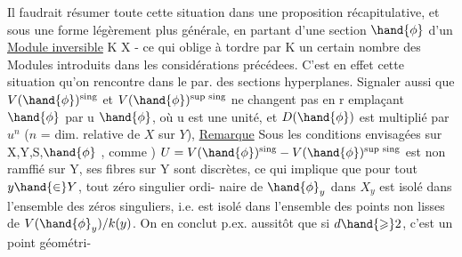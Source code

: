 \placedmargin{$\|$} Il faudrait résumer  toute cette situation dans une proposition
récapitulative, et sous une forme légèrement plus générale, en partant
d'une section $\hand{\phi}$ d'un \uline{Module inversible}  K  X - ce qui oblige
à tordre par K un certain nombre des Modules introduits dans les
considérations précédees. C'est en effet  cette situation qu'on
rencontre  dans le par. des sections hyperplanes. Signaler aussi que
\placedmargin{|} $V(\hand{\phi})^{\text{sing}}$  et $V(\hand{\phi})^{\text{sup sing}}$ ne changent pas en r emplaçant $\hand{\phi}$ par u $\hand{\phi}$,
où u est une unité, 
et $D(\hand{\phi})$ est multiplié par $u^n$ ($n$ = dim. relative de $X$ sur $Y$),
\uline{Remarque} Sous les conditions envisagées sur X,Y,S,$\hand{\phi}$ , comme )
$U = V(\hand{\phi})^{\text{sing}}- V(\hand{\phi})^{\text{sup sing}}$ est non ramffié sur Y, ses fibres sur Y sont
discrètes, ce qui implique que pour tout $y\hand{\in} Y$, tout zéro singulier ordi-%
naire de $\hand{\phi}_y$ dans $X_y$ est isolé dans l'ensemble des zéros singuliers, 
i.e. est isolé dans l'ensemble des points non lisses de $V(\hand{\phi}_y)/k(y)$.
 On en conclut p.ex. aussitôt que si $d\hand{\geqslant} 2$, c'est un point géométri-%

